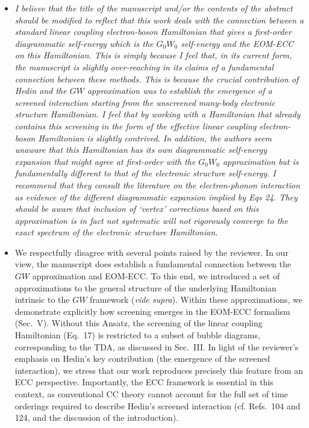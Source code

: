 \documentclass[10pt]{uhhlet}
\begin{document}
\begin{itemize}  
  \item[] \textit{I believe that the title of the manuscript and/or the contents of the abstract should be modified to reflect that this work deals with the connection between a standard linear coupling electron-boson Hamiltonian that gives a first-order diagrammatic self-energy which is the $G_0W_0$ self-energy and the EOM-ECC on this Hamiltonian. This is simply because I feel that, in its current form, the manuscript is slightly over-reaching in its claims of a fundamental connection between these methods. This is because the crucial contribution of Hedin and the $GW$ approximation was to establish the emergence of a screened interaction starting from the unscreened many-body electronic structure Hamiltonian. I feel that by working with a Hamiltonian that already contains this screening in the form of the effective linear coupling electron-boson Hamiltonian is slightly contrived. In addition, the authors seem unaware that this Hamiltonian has its own diagrammatic self-energy expansion that might agree at first-order with the $G_0W_0$ approximation but is fundamentally different to that of the electronic structure self-energy. I recommend that they consult the literature on the electron-phonon interaction as evidence of the different diagrammatic expansion implied by Eqs 24. They should be aware that inclusion of `vertex' corrections based on this approximation is in fact not systematic will not rigorously converge to the exact spectrum of the electronic structure Hamiltonian. }

  \item[] We respectfully disagree with several points raised by the reviewer. In our view, the manuscript does establish a fundamental connection between the $GW$ approximation and EOM-ECC. To this end, we introduced a set of approximations to the general structure of the underlying Hamiltonian intrinsic to the $GW$ framework (\textit{vide supra}). 
  Within these approximations, we demonstrate explicitly how screening emerges in the EOM-ECC formalism (Sec.~V). Without this Ansatz, the screening of the linear coupling Hamiltonian (Eq.~17) is restricted to a subset of bubble diagrams, corresponding to the TDA, as discussed in Sec.~III. 
  In light of the reviewer's emphasis on Hedin's key contribution (the emergence of the screened interaction), we stress that our work reproduces precisely this feature from an ECC perspective.
  Importantly, the ECC framework is essential in this context, as conventional CC theory cannot account for the full set of time orderings required to describe Hedin's screened interaction (cf. Refs.~104 and 124, and the discussion of the introduction).
\end{itemize}
\end{document}
